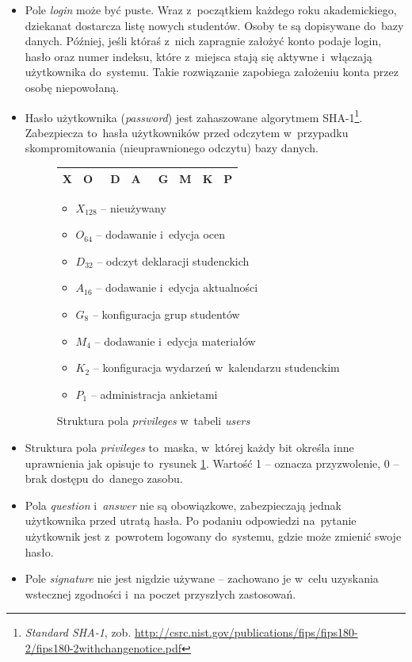 \documentclass[a4paper,12pt,oneside]{report}
\begin{document}
\begin{itemize}
  \item Pole \emph{login} może być puste. Wraz z~początkiem każdego roku akademickiego, dziekanat dostarcza listę nowych studentów. Osoby te są dopisywane do~bazy danych. Później, jeśli któraś z~nich zapragnie założyć konto podaje login, hasło oraz numer indeksu, które z~miejsca stają się aktywne i~włączają użytkownika do~systemu. Takie rozwiązanie zapobiega założeniu konta przez osobę niepowołaną.
  \item Hasło użytkownika (\emph{password}) jest zahaszowane algorytmem SHA-1\footnote{\emph{Standard SHA-1}, zob. \url{http://csrc.nist.gov/publications/fips/fips180-2/fips180-2withchangenotice.pdf}}. Zabezpiecza to~hasła użytkowników przed odczytem w~przypadku skompromitowania (nieuprawnionego odczytu) bazy danych.
\begin{figure}[h]
  \centering
  \begin{tabular}{|c|c|c|c|c|c|c|c|}\hline
    X & O~& D & A~& G & M & K & P \\\hline
  \end{tabular}
  \begin{itemize}
    \item $X_{128}$ -- nieużywany
    \item $O_{64}$ -- dodawanie i~edycja ocen
    \item $D_{32}$ -- odczyt deklaracji studenckich
    \item $A_{16}$ -- dodawanie i~edycja aktualności
    \item $G_8$ -- konfiguracja grup studentów
    \item $M_4$ -- dodawanie i~edycja materiałów
    \item $K_2$ -- konfiguracja wydarzeń w~kalendarzu studenckim
    \item $P_1$ -- administracja ankietami
  \end{itemize}
  \caption{Struktura pola \emph{privileges} w~tabeli \emph{users}\label{fig:privileges}}
\end{figure}
  \item Struktura pola \emph{privileges} to~maska, w~której każdy bit określa inne uprawnienia jak opisuje to~rysunek \ref{fig:privileges}. Wartość 1 -- oznacza przyzwolenie, 0 -- brak dostępu do~danego zasobu.
  \item Pola \emph{question} i~\emph{answer} nie są obowiązkowe, zabezpieczają jednak użytkownika przed utratą hasła. Po podaniu odpowiedzi na~pytanie użytkownik jest z~powrotem logowany do~systemu, gdzie może zmienić swoje hasło.
  \item Pole \emph{signature} nie jest nigdzie używane -- zachowano je w~celu uzyskania wstecznej zgodności i~na poczet przyszłych zastosowań.
\end{itemize}
\end{document}

